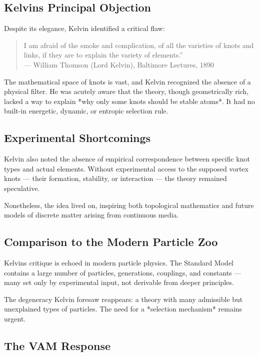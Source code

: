 \subsection*{Kelvin\rqs s Principal Objection}

Despite its elegance, Kelvin identified a critical flaw:

\begin{quote}
 \grqq I am afraid of the smoke and complication, of all the varieties of knots and links, if they are to explain the variety of elements.\textquotedblright \\
 — William Thomson (Lord Kelvin), Baltimore Lectures, 1890
\end{quote}

The mathematical space of knots is vast, and Kelvin recognized the absence of a physical filter. He was acutely aware that the theory, though geometrically rich, lacked a way to explain *why only some knots should be stable atoms*. It had no built-in energetic, dynamic, or entropic selection rule.

\subsection*{Experimental Shortcomings}

Kelvin also noted the absence of empirical correspondence between specific knot types and actual elements. Without experimental access to the supposed vortex knots — their formation, stability, or interaction — the theory remained speculative.

Nonetheless, the idea lived on, inspiring both topological mathematics and future models of discrete matter arising from continuous media.

\subsection*{Comparison to the Modern Particle Zoo}

Kelvin\rqs s critique is echoed in modern particle physics. The Standard Model contains a large number of particles, generations, couplings, and constants — many set only by experimental input, not derivable from deeper principles.

The degeneracy Kelvin foresaw reappears: a theory with many admissible but unexplained types of particles. The need for a *selection mechanism* remains urgent.

\subsection*{The VAM Response}

